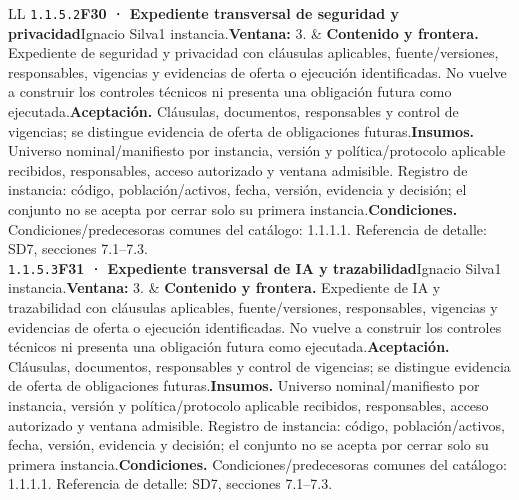 \begin{longtable}{L{\tabcolsep\relax}L{\tabcolsep\relax}}
\texttt{1.\allowbreak{}1.\allowbreak{}5.\allowbreak{}2}\newline{}\textbf{F30 · Expediente transversal de seguridad y privacidad}\newline{}Ignacio Silva\newline{}1 instancia.\newline{}\textbf{Ventana:} 3. & \textbf{Contenido y frontera.} Expediente de seguridad y privacidad con cláusulas aplicables, fuente/versiones, responsables, vigencias y evidencias de oferta o ejecución identificadas. No vuelve a construir los controles técnicos ni presenta una obligación futura como ejecutada.\newline{}\textbf{Aceptación.} Cláusulas, documentos, responsables y control de vigencias; se distingue evidencia de oferta de obligaciones futuras.\newline{}\textbf{Insumos.} Universo nominal/manifiesto por instancia, versión y política/protocolo aplicable recibidos, responsables, acceso autorizado y ventana admisible. Registro de instancia: código, población/activos, fecha, versión, evidencia y decisión; el conjunto no se acepta por cerrar solo su primera instancia.\newline{}\textbf{Condiciones.} Condiciones/predecesoras comunes del catálogo: 1.1.1.1. Referencia de detalle: SD7, secciones 7.1--7.3.\\\hline
\texttt{1.\allowbreak{}1.\allowbreak{}5.\allowbreak{}3}\newline{}\textbf{F31 · Expediente transversal de IA y trazabilidad}\newline{}Ignacio Silva\newline{}1 instancia.\newline{}\textbf{Ventana:} 3. & \textbf{Contenido y frontera.} Expediente de IA y trazabilidad con cláusulas aplicables, fuente/versiones, responsables, vigencias y evidencias de oferta o ejecución identificadas. No vuelve a construir los controles técnicos ni presenta una obligación futura como ejecutada.\newline{}\textbf{Aceptación.} Cláusulas, documentos, responsables y control de vigencias; se distingue evidencia de oferta de obligaciones futuras.\newline{}\textbf{Insumos.} Universo nominal/manifiesto por instancia, versión y política/protocolo aplicable recibidos, responsables, acceso autorizado y ventana admisible. Registro de instancia: código, población/activos, fecha, versión, evidencia y decisión; el conjunto no se acepta por cerrar solo su primera instancia.\newline{}\textbf{Condiciones.} Condiciones/predecesoras comunes del catálogo: 1.1.1.1. Referencia de detalle: SD7, secciones 7.1--7.3.\\\hline

\end{longtable}

